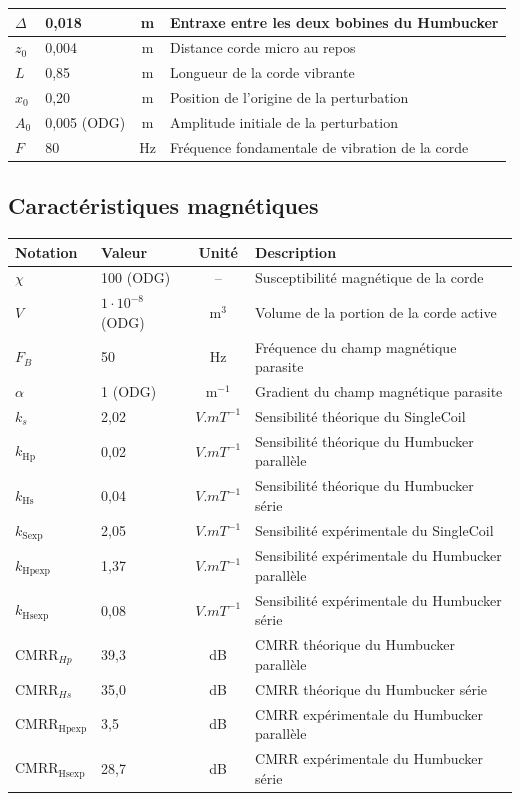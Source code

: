 \documentclass[a4paper,11pt]{article}
\begin{document}
\begin{center}
\begin{tabularx}{\textwidth}{llcX}
$\Delta$ & 0,018 & m & Entraxe entre les deux bobines du Humbucker \\
\midrule
$z_{0}$ & 0,004 & m & Distance corde micro au repos \\
$L$ & 0,85 & m & Longueur de la corde vibrante \\
$x_{0}$ & 0,20 & m & Position de l'origine de la perturbation \\
$A_{0}$ & 0,005 (ODG) & m & Amplitude initiale de la perturbation \\
$F$ & 80 & Hz & Fréquence fondamentale de vibration de la corde \\
\bottomrule
\end{tabularx}
\end{center}

\subsection{Caractéristiques magnétiques}
\begin{center}
\small
\begin{tabularx}{\textwidth}{llcX}
\toprule
\textbf{Notation} & \textbf{Valeur} & \textbf{Unité} & \textbf{Description} \\
\midrule
$\chi$ & 100 (ODG) & -- & Susceptibilité magnétique de la corde \\
$V$ & $1 \cdot 10^{-8}$ (ODG) & m$^{3}$ & Volume de la portion de la corde active \\
\midrule
$F_{B}$ & 50 & Hz & Fréquence du champ magnétique parasite \\
$\alpha$ & 1 (ODG) & m$^{-1}$ & Gradient du champ magnétique parasite \\
\midrule
$k_{s}$ & 2,02 & $V.mT^{-1}$ & Sensibilité théorique du SingleCoil \\
$k_{\text{Hp}}$ & 0,02 & $V.mT^{-1}$ & Sensibilité théorique du Humbucker parallèle \\
$k_{\text{Hs}}$ & 0,04 & $V.mT^{-1}$ & Sensibilité théorique du Humbucker série \\
$k_{\text{Sexp}}$ & 2,05 & $V.mT^{-1}$ & Sensibilité expérimentale du SingleCoil \\
$k_{\text{Hpexp}}$ & 1,37 & $V.mT^{-1}$ & Sensibilité expérimentale du Humbucker parallèle \\
$k_{\text{Hsexp}}$ & 0,08 & $V.mT^{-1}$ & Sensibilité expérimentale du Humbucker série \\
\midrule
$\text{CMRR}_{Hp}$ & 39,3 & dB & CMRR théorique du Humbucker parallèle \\
$\text{CMRR}_{Hs}$ & 35,0 & dB & CMRR théorique du Humbucker série \\
$\text{CMRR}_{\text{Hpexp}}$ & 3,5 & dB & CMRR expérimentale du Humbucker parallèle \\
$\text{CMRR}_{\text{Hsexp}}$ & 28,7 & dB & CMRR expérimentale du Humbucker série \\
\bottomrule
\end{tabularx}
\end{center}
\end{document}
